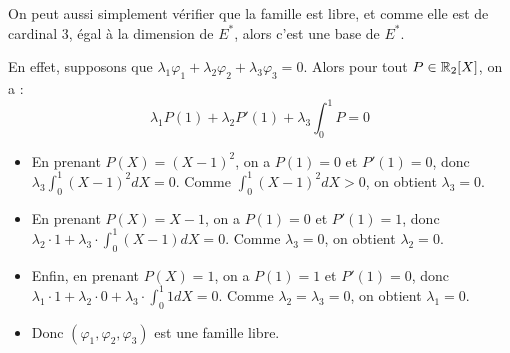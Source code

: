 \documentclass[11pt,a4paper]{report}
\begin{document}
\begin{example}
    On peut aussi simplement vérifier que la famille est libre, et comme elle est de cardinal 3, égal à la dimension de $E^*$, alors c'est une base de $E^*$.
    
    En effet, supposons que $\lambda_1 \varphi_1 + \lambda_2 \varphi_2 + \lambda_3 \varphi_3 = 0$. Alors pour tout $P \in \mathbb{R}_2[X]$, on a :
    $$\lambda_1 P(1) + \lambda_2 P'(1) + \lambda_3 \int_0^1 P = 0$$
    
    \begin{itemize}
        \item En prenant $P(X) = (X-1)^2$, on a $P(1) = 0$ et $P'(1) = 0$, donc $\lambda_3 \int_0^1 (X-1)^2 dX = 0$. Comme $\int_0^1 (X-1)^2 dX > 0$, on obtient $\lambda_3 = 0$.
        \item En prenant $P(X) = X-1$, on a $P(1) = 0$ et $P'(1) = 1$, donc $\lambda_2 \cdot 1 + \lambda_3 \cdot \int_0^1 (X-1) dX = 0$. Comme $\lambda_3 = 0$, on obtient $\lambda_2 = 0$.
        \item Enfin, en prenant $P(X) = 1$, on a $P(1) = 1$ et $P'(1) = 0$, donc $\lambda_1 \cdot 1 + \lambda_2 \cdot 0 + \lambda_3 \cdot \int_0^1 1 dX = 0$. Comme $\lambda_2 = \lambda_3 = 0$, on obtient $\lambda_1 = 0$.
        \item Donc $(\varphi_1, \varphi_2, \varphi_3)$ est une famille libre.
    \end{itemize}


\end{example}
\end{document}
